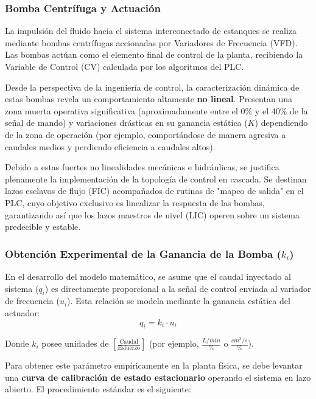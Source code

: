 \subsubsection{Bomba Centrífuga y Actuación}
La impulsión del fluido hacia el sistema interconectado de estanques se realiza mediante bombas centrífugas accionadas por Variadores de Frecuencia (VFD). Las bombas actúan como el elemento final de control de la planta, recibiendo la Variable de Control (CV) calculada por los algoritmos del PLC.

Desde la perspectiva de la ingeniería de control, la caracterización dinámica de estas bombas revela un comportamiento altamente \textbf{no lineal}. Presentan una zona muerta operativa significativa (aproximadamente entre el 0\% y el 40\% de la señal de mando) y variaciones drásticas en su ganancia estática ($K$) dependiendo de la zona de operación (por ejemplo, comportándose de manera agresiva a caudales medios y perdiendo eficiencia a caudales altos). 

Debido a estas fuertes no linealidades mecánicas e hidráulicas, se justifica plenamente la implementación de la topología de control en cascada. Se destinan lazos esclavos de flujo (FIC) acompañados de rutinas de "mapeo de salida" en el PLC, cuyo objetivo exclusivo es linealizar la respuesta de las bombas, garantizando así que los lazos maestros de nivel (LIC) operen sobre un sistema predecible y estable.
\subsubsection{Obtención Experimental de la Ganancia de la Bomba ($k_i$)}

En el desarrollo del modelo matemático, se asume que el caudal inyectado al sistema ($q_i$) es directamente proporcional a la señal de control enviada al variador de frecuencia ($u_i$). Esta relación se modela mediante la ganancia estática del actuador:
\begin{equation}
    q_i = k_i \cdot u_i
\end{equation}

Donde $k_i$ posee unidades de $\left[ \frac{\text{Caudal}}{\text{Esfuerzo}} \right]$ (por ejemplo, $\frac{L/min}{\text{\%}}$ o $\frac{cm^3/s}{\%}$).

Para obtener este parámetro empíricamente en la planta física, se debe levantar una \textbf{curva de calibración de estado estacionario} operando el sistema en lazo abierto. El procedimiento estándar es el siguiente:

